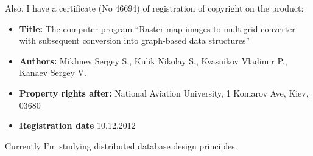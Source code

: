 \documentclass[11pt,a4paper,russian]{moderncv}
\begin{document}
\par{Also, I have a certificate (No 46694) of registration of copyright on the product:
\begin{itemize}
\item \textbf{Title:} The computer program ``Raster map images to multigrid converter with subsequent conversion into graph-based data structures''
\item \textbf{Authors:} Mikhnev Sergey S., Kulik Nikolay S., Kvasnikov Vladimir P., Kanaev Sergey V.
\item \textbf{Property rights after:} National Aviation University, 1 Komarov Ave, Kiev, 03680
\item \textbf{Registration date} 10.12.2012
\end{itemize}}
\par{Currently I'm studying distributed database design principles.}

\clearpage
\end{document}
